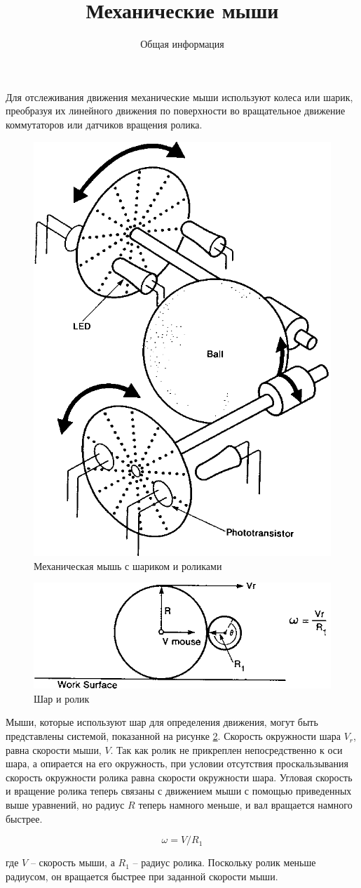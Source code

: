\documentclass[11pt, a4paper]{article}
\begin{document}
\title{Механические мыши}
\author{Общая информация}
\date{}
\maketitle

Для отслеживания движения механические мыши используют колеса или шарик, преобразуя их линейного движения по поверхности во вращательное движение коммутаторов или датчиков вращения ролика.

\begin{figure}[h]
    \centering
    \includegraphics[width=0.3\linewidth]{theory_mech/2.1.png}
    \caption{Механическая мышь с шариком и роликами}
    \label{fig:theoryBallOpt}
\end{figure}

\begin{figure}[h]
    \centering
    \includegraphics[width=0.3\linewidth]{theory_mech/2.2.png}
    \caption{Шар и ролик}
    \label{fig:theoryBallRoll}
\end{figure}

Мыши, которые используют шар для определения движения, могут быть представлены системой, показанной на рисунке \ref{fig:theoryBallRoll}. Скорость окружности шара $V_r$, равна скорости мыши, $V$. Так как ролик не прикреплен непосредственно к оси шара, а опирается на его окружность, при условии отсутствия проскальзывания скорость окружности ролика равна скорости окружности шара. Угловая скорость и вращение ролика теперь связаны с движением мыши с помощью приведенных выше уравнений, но радиус $R$ теперь намного меньше, и вал вращается намного быстрее.

$$\omega = V/R_1$$

\noindent где $V$ -- скорость мыши, а $R_1$ -- радиус ролика. Поскольку ролик меньше радиусом, он вращается быстрее при заданной скорости мыши.
\end{document}
